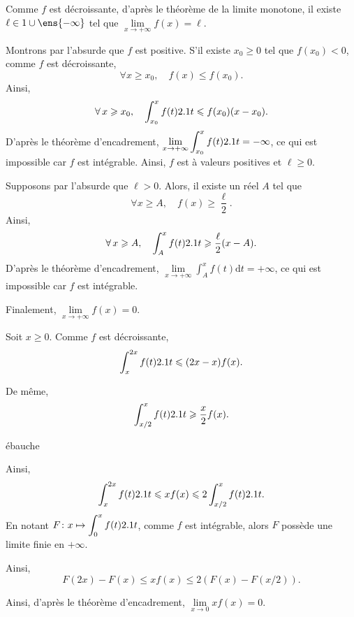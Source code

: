 \begin{elemsolution}
\begin{reponses}
\item Comme $f$ est décroissante, d'après le théorème de la limite monotone, il existe $\ell \in \R \cup \ens{-\infty}$ tel que $\lim\limits_{x\to+\infty} f(x) = \ell$.

\item Montrons par l'absurde que $f$ est positive. S'il existe $x_0 \geqslant 0$ tel que $f(x_0) < 0$, comme $f$ est décroissante,
\[
\forall x \geqslant x_0,\quad f(x) \leqslant f(x_0).
\]
Ainsi,
\[
\forall x \geqslant x_0,\quad \displaystyle\int_{x_0}^x f(t) \d t \leqslant f(x_0) (x - x_0).
\]
D'après le théorème d'encadrement, $\lim\limits_{x\to+\infty} \displaystyle\int_{x_0}^x f(t) \d t = -\infty$, ce qui est impossible car $f$ est intégrable. Ainsi, $f$ est à valeurs positives et $\ell \geqslant 0$.

\item Supposons par l'absurde que $\ell > 0$. Alors, il existe un réel $A$ tel que
\[
\forall x \geqslant A,\quad f(x) \geqslant \frac{\ell}{2}.
\]
Ainsi,
\[
\forall x \geqslant A,\quad \displaystyle\int_A^x f(t) \d t \geqslant \frac{\ell}{2} (x - A).
\]
D'après le théorème d'encadrement, $\lim\limits_{x\to+\infty} \displaystyle\int_A^x f(t) \mathrm{d}t = +\infty$, ce qui est impossible car $f$ est intégrable.

Finalement, $\lim\limits_{x\to+\infty} f(x) = 0$.

\item Soit $x \geqslant 0$. Comme $f$ est décroissante,
\[
\int_x^{2 x} f(t) \d t \leqslant (2 x - x) f(x).
\]

De même,
\[
\int_{x/2}^x f(t) \d t \geqslant \frac{x}{2} f(x).
\]

\begin{marginfigure}
    \centering
    \caption{ébauche}
\end{marginfigure}


Ainsi,
\[
\int_x^{2 x} f(t) \d t \leqslant x f(x) \leqslant 2 \int_{x/2}^x f(t) \d t.
\]
En notant $\fonctionligne[F]{x}{\displaystyle\int_0^x f(t) \d t}$, comme $f$ est intégrable, alors $F$ possède une limite finie en $+\infty$.

Ainsi,
\[
F(2 x) - F(x) \leqslant x f(x) \leqslant 2 (F(x) - F(x/2)).
\]

Ainsi, d'après le théorème d'encadrement, $\lim\limits_{x\to 0} x f(x) = 0$.
\end{reponses}
\end{elemsolution}

